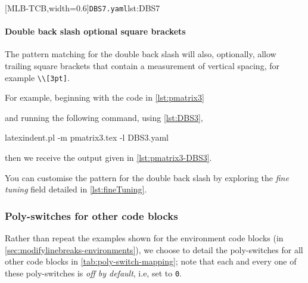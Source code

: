 		\begin{cmhtcbraster}[
				raster force size=false,
				raster column 1/.style={add to width=-.1\textwidth},
				raster column skip=.03\linewidth]
			[MLB-TCB,width=0.6\textwidth]{\texttt{DBS7.yaml}}{lst:DBS7}
		\end{cmhtcbraster}

	\paragraph{Double back slash optional square brackets}
		The pattern matching for the double back slash will also, optionally, allow trailing
		square brackets that contain a measurement of vertical spacing, for example
		\lstinline!\\[3pt]!. 

		For example, beginning with the code in \cref{lst:pmatrix3}


		and running the following command, using \cref{lst:DBS3},  
		\begin{commandshell}
latexindent.pl -m pmatrix3.tex -l DBS3.yaml
\end{commandshell}
		then we receive the output given in \cref{lst:pmatrix3-DBS3}.


		You can customise the pattern for the double back slash by exploring the \emph{fine
		tuning} field detailed in \vref{lst:fineTuning}.

\subsubsection{Poly-switches for other code blocks}
	Rather than repeat the examples shown for the environment code blocks (in
	\vref{sec:modifylinebreaks-environments}), we choose to detail the poly-switches for all
	other code blocks in \cref{tab:poly-switch-mapping}; note that each and every one of
	these poly-switches is \emph{off by default}, i.e, set to \texttt{0}.


